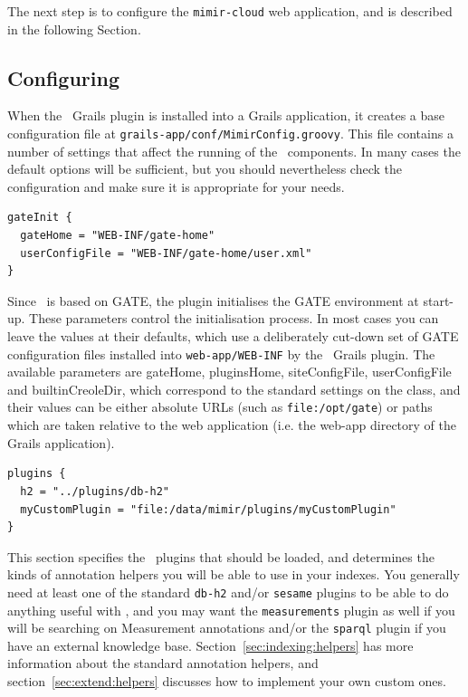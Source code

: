 The next step is to configure the {\tt mimir-cloud} web application, and is
described in the following Section.

\subsection{Configuring}\label{sec:admin:config}

When the \Mimir\ Grails plugin is installed into a Grails application, it
creates a base configuration file at {\tt grails-app/conf/MimirConfig.groovy}.
This file contains a number of settings that affect the running of the \Mimir\
components. In many cases the default options will be sufficient, but you should
nevertheless check the configuration and make sure it is appropriate for your
needs.

\begin{lstlisting}
gateInit {
  gateHome = "WEB-INF/gate-home"
  userConfigFile = "WEB-INF/gate-home/user.xml"
}
\end{lstlisting}

Since \Mimir\ is based on GATE, the plugin initialises the GATE environment at
start-up.  These parameters control the initialisation process.  In most cases
you can leave the values at their defaults, which use a deliberately cut-down
set of GATE configuration files installed into {\tt web-app/WEB-INF} by the
\Mimir\ Grails plugin.  The available parameters are gateHome, pluginsHome,
siteConfigFile, userConfigFile and builtinCreoleDir, which correspond to the
standard settings on the
class, and their values can be either absolute URLs (such as
\verb|file:/opt/gate|) or paths which are taken relative to the web application
(i.e. the web-app directory of the Grails application).

\begin{lstlisting}
plugins {
  h2 = "../plugins/db-h2"
  myCustomPlugin = "file:/data/mimir/plugins/myCustomPlugin"
}
\end{lstlisting}

This section specifies the \Mimir\ plugins that should be loaded, and
determines the kinds of annotation helpers you will be able to use in your
indexes.  You generally need at least one of the standard {\tt db-h2} and/or
{\tt sesame} plugins to be able to do anything useful with \Mimir, and you may
want the {\tt measurements} plugin as well if you will be searching on
Measurement annotations and/or the {\tt sparql} plugin if you have an external
knowledge base.  Section~\ref{sec:indexing:helpers} has more information about
the standard annotation helpers, and section~\ref{sec:extend:helpers} discusses
how to implement your own custom ones.

